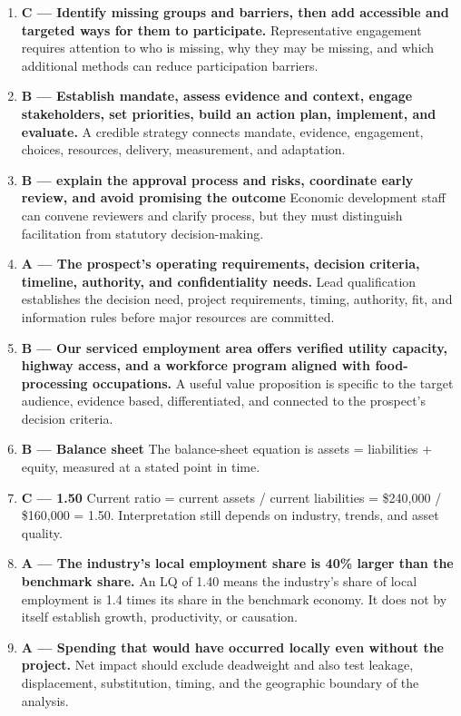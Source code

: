 \documentclass[11pt,letterpaper,oneside,openany]{book}
\begin{document}
\begin{enumerate}[leftmargin=*,itemsep=.8em]
\item \textbf{C --- Identify missing groups and barriers, then add accessible and targeted ways for them to participate.} Representative engagement requires attention to who is missing, why they may be missing, and which additional methods can reduce participation barriers.
\item \textbf{B --- Establish mandate, assess evidence and context, engage stakeholders, set priorities, build an action plan, implement, and evaluate.} A credible strategy connects mandate, evidence, engagement, choices, resources, delivery, measurement, and adaptation.
\item \textbf{B --- explain the approval process and risks, coordinate early review, and avoid promising the outcome} Economic development staff can convene reviewers and clarify process, but they must distinguish facilitation from statutory decision-making.
\item \textbf{A --- The prospect's operating requirements, decision criteria, timeline, authority, and confidentiality needs.} Lead qualification establishes the decision need, project requirements, timing, authority, fit, and information rules before major resources are committed.
\item \textbf{B --- Our serviced employment area offers verified utility capacity, highway access, and a workforce program aligned with food-processing occupations.} A useful value proposition is specific to the target audience, evidence based, differentiated, and connected to the prospect's decision criteria.
\item \textbf{B --- Balance sheet} The balance-sheet equation is assets = liabilities + equity, measured at a stated point in time.
\item \textbf{C --- 1.50} Current ratio = current assets / current liabilities = \$240,000 / \$160,000 = 1.50. Interpretation still depends on industry, trends, and asset quality.
\item \textbf{A --- The industry's local employment share is 40\% larger than the benchmark share.} An LQ of 1.40 means the industry's share of local employment is 1.4 times its share in the benchmark economy. It does not by itself establish growth, productivity, or causation.
\item \textbf{A --- Spending that would have occurred locally even without the project.} Net impact should exclude deadweight and also test leakage, displacement, substitution, timing, and the geographic boundary of the analysis.

\end{enumerate}
\end{document}
